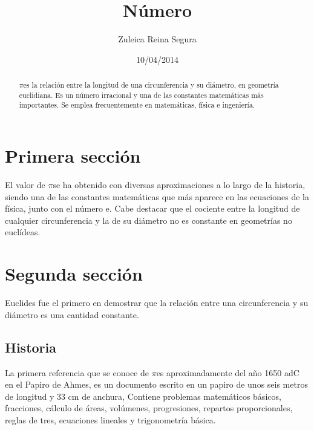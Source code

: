 \documentclass[a4paper,12pt]{article}
\title{Número \PI}
\author{Zuleica Reina Segura}
\date{10/04/2014}
\newcommand{\PI}{$\pi$}
\begin{document}
\maketitle
\begin{abstract}
  \PI es la relación entre la longitud de una circunferencia y su diámetro, 
  en geometría euclidiana. Es un número irracional y una de las constantes matemáticas más importantes. 
  Se emplea frecuentemente en matemáticas, física e ingeniería.
\end{abstract}
\section{Primera sección}
El valor de \PI se ha obtenido con diversas aproximaciones a lo largo de la historia, 
siendo una de las constantes matemáticas que más aparece en las ecuaciones de la física, 
junto con el número e. Cabe destacar que el cociente entre la longitud de cualquier circunferencia 
y la de su diámetro no es constante en geometrías no euclídeas.
\section{Segunda sección}
Euclides fue el primero en demostrar que la relación entre una circunferencia y su diámetro 
es una cantidad constante.
\subsection{Historia}
La primera referencia que se conoce de \PI es aproximadamente del año 1650 adC en el Papiro de Ahmes, 
es un documento escrito en un papiro de unos seis metros de longitud y 33 cm de anchura, Contiene problemas 
matemáticos básicos, fracciones, cálculo de áreas, volúmenes, progresiones, repartos proporcionales, 
reglas de tres, ecuaciones lineales y trigonometría básica.
\cite{wikipedia}
\end{document}
